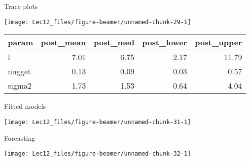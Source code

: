 \documentclass[11pt,ignorenonframetext,]{beamer}
\begin{document}
\begin{frame}{Trace plots}
\protect\hypertarget{trace-plots-1}{}

\begin{center}\texttt{[image: Lec12\_files/figure-beamer/unnamed-chunk-29-1]} \end{center}

\footnotesize

\begin{longtable}[]{@{}lrrrr@{}}
\toprule
param & post\_mean & post\_med & post\_lower &
post\_upper\tabularnewline
\midrule
\endhead
l & 7.01 & 6.75 & 2.17 & 11.79\tabularnewline
nugget & 0.13 & 0.09 & 0.03 & 0.57\tabularnewline
sigma2 & 1.73 & 1.53 & 0.64 & 4.04\tabularnewline
\bottomrule
\end{longtable}

\end{frame}

\begin{frame}{Fitted models}
\protect\hypertarget{fitted-models-1}{}

\begin{center}\texttt{[image: Lec12\_files/figure-beamer/unnamed-chunk-31-1]} \end{center}

\end{frame}

\begin{frame}{Forcasting}
\protect\hypertarget{forcasting-1}{}

\begin{center}\texttt{[image: Lec12\_files/figure-beamer/unnamed-chunk-32-1]} \end{center}

\end{frame}
\end{document}
